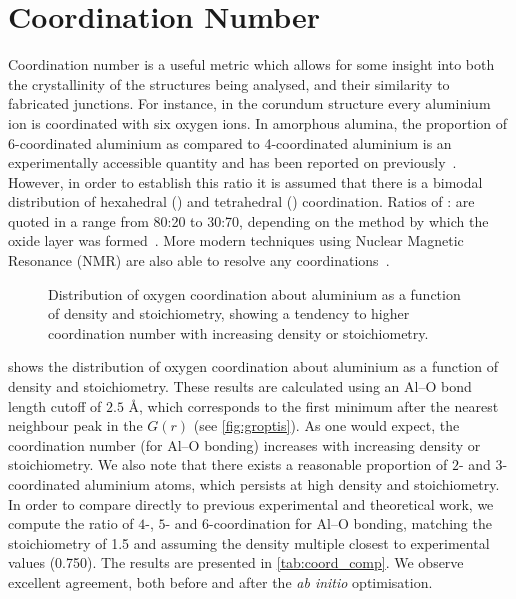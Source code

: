 \section{Coordination Number}\label{sec:coord}
Coordination number is a useful metric which allows for some insight into both the crystallinity of the structures being analysed, and their similarity to fabricated junctions. For instance, in the corundum structure every aluminium ion is coordinated with six oxygen ions. In amorphous alumina, the proportion of 6-coordinated aluminium as compared to 4-coordinated aluminium is an experimentally accessible quantity and has been reported on previously~\cite{ElMashri1983}. However, in order to establish this ratio it is assumed that there is a bimodal distribution of hexahedral () and tetrahedral () coordination. Ratios of : are quoted in a range from 80:20 to 30:70, depending on the method by which the oxide layer was formed~\cite{Bourdillon1984}. More modern techniques using Nuclear Magnetic Resonance (NMR) are also able to resolve any  coordinations~\cite{Lee2009}.


\begin{figure}[htp]
\centering
\resizebox{\textwidth}{!}{}
\caption[Oxygen Coordination]{\label{fig:coordinationnumber}Distribution of oxygen coordination about aluminium as a function of density and stoichiometry, showing a tendency to higher coordination number with increasing density or stoichiometry.}%
\end{figure}

 shows the distribution of oxygen coordination about aluminium as a function of density and stoichiometry. These results are calculated using an Al--O bond length cutoff of $2.5$ \AA, which corresponds to the first minimum after the nearest neighbour peak in the $G(r)$ (see \cref{fig:groptis}). As one would expect, the coordination number (for Al--O bonding) increases with increasing density or stoichiometry. We also note that there exists a reasonable proportion of $2$- and $3$-coordinated aluminium atoms, which persists at high density and stoichiometry. In order to compare directly to previous experimental and theoretical work, we compute the ratio of $4$-, $5$- and $6$-coordination for Al--O bonding, matching the stoichiometry of 1.5 and assuming the density multiple closest to experimental values (0.750). The results are presented in \cref{tab:coord_comp}. We observe excellent agreement, both before and after the \textit{ab initio} optimisation.

